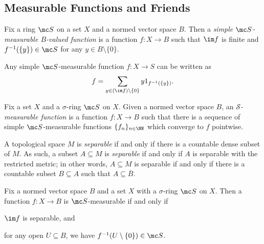 \documentclass{article}
\begin{document}
\subsection{Measurable Functions and Friends}
\begin{definition}
	Fix a ring $\mc S$ on a set $X$ and a normed vector space $B$. Then a \textit{simple $\mc S$-measurable $B$-valued function} is a function $f\colon X\to B$ such that $\im f$ is finite and $f^{-1}(\{y\})\in\mc S$ for any $y\in B\setminus\{0\}$.
\end{definition}
\begin{remark}
	Any simple $\mc S$-measurable function $f\colon X\to S$ can be written as
	\[f=\sum_{y\in(\im f)\setminus\{0\}}y1_{f^{-1}(\{y\})}.\]
\end{remark}
\begin{definition}
	Fix a set $X$ and a $\sigma$-ring $\mc S$ on $X$. Given a normed vector space $B$, an \textit{$\mathcal S$-measurable function} is a function $f\colon X\to B$ such that there is a sequence of simple $\mc S$-measurable functions $\{f_n\}_{n\in\NN}$ which converge to $f$ pointwise.
\end{definition}
\begin{definition}[Separable]
	A topological space $M$ is \textit{separable} if and only if there is a countable dense subset of $M$. As such, a subset $A\subseteq M$ is \textit{separable} if and only if $A$ is separable with the restricted metric; in other words, $A\subseteq M$ is separable if and only if there is a countable subset $B\subseteq A$ such that $A\subseteq\overline B$.
\end{definition}
\begin{theorem} \label{thm:better-measurable}
	Fix a normed vector space $B$ and a set $X$ with a $\sigma$-ring $\mc S$ on $X$. Then a function $f\colon X\to B$ is $\mc S$-measurable if and only if
	\begin{listroman}
		\item $\im f$ is separable, and
		\item for any open $U\subseteq B$, we have $f^{-1}(U\setminus\{0\})\in\mc S$.
	\end{listroman}
\end{theorem}
\end{document}

